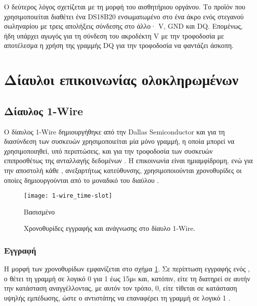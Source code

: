 Ο δεύτερος λόγος σχετίζεται με τη μορφή του αισθητήριου οργάνου. Το προϊόν που
χρησιμοποιείται διαθέτει ένα DS18B20 ενσωματωμένο στο ένα άκρο ενός στεγανού
σωληναρίου με τρεις απολήξεις σύνδεσης στο άλλο· V, GND και DQ.
Επομένως, ήδη υπάρχει αγωγός για τη σύνδεση του ακροδέκτη V με την
τροφοδοσία με αποτέλεσμα η χρήση της γραμμής DQ για την τροφοδοσία να φαντάζει
άσκοπη.


\section{Δίαυλοι επικοινωνίας ολοκληρωμένων}
\label{sec:buses}


\subsection{Δίαυλος 1-Wire}
\label{subsec:1-wire}

Ο δίαυλος 1-Wire δημιουργήθηκε από την Dallas Semiconductor και για τη
διασύνδεση των συσκευών χρησιμοποιείται μία μόνο γραμμή, η οποία μπορεί να
χρησιμοποιηθεί, υπό περιπτώσεις, και για την τροφοδοσία των συσκευών
επιπροσθέτως της ανταλλαγής δεδομένων \parencite[1]{atmel04}. Η επικοινωνία
είναι ημιαμφίδρομη, ενώ για την αποστολή κάθε , ανεξαρτήτως κατεύθυνσης,
χρησιμοποιούνται χρονοθυρίδες οι οποίες δημιουργούνται από το μοναδικό
 του διαύλου \parencites[2]{atmel04}[15]{ds18b20}.

\begin{figure}
    \caption{Χρονοθυρίδες εγγραφής και ανάγνωσης στο δίαυλο 1-Wire.
    \label{fig:1-wire:time-slot}}
    \begin{center}
    \texttt{[image: 1-wire\_time-slot]}
    \end{center}
    Βασισμένο 
\end{figure}


\subsubsection{Εγγραφή}

Η μορφή των χρονοθυρίδων εμφανίζεται στο σχήμα \ref{fig:1-wire:time-slot}. Σε
περίπτωση εγγραφής ενός , ο  θέτει τη γραμμή σε λογικό 0 για
1 έως 15μs και, κατόπιν, είτε τη διατηρεί σε αυτήν την κατάσταση αναγγέλλοντας,
με αυτόν τον τρόπο,  0, είτε τίθεται σε κατάσταση υψηλής εμπέδωσης, ώστε
ο αντιστάτης  να επαναφέρει τη γραμμή σε λογικό 1
\parencite[2]{atmel04}.


